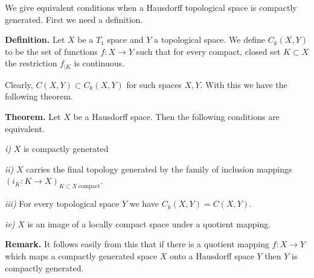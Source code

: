 \documentclass[12pt]{article}
\theoremstyle{definition}
\theoremstyle{plain}
\begin{document}
We give equivalent conditions when a Hausdorff topological space is compactly generated. First we need a definition.

\textbf{Definition.} Let $X$ be a $T_1$ space and $Y$ a topological space. We define $C_k(X, Y)$ to be the set of functions $f \colon X \to Y$ such that for every compact, closed set $K \subset X$ the restriction $f_{|K}$ is continuous. 

Clearly, $C(X, Y) \subset C_k(X, Y)$ for such spaces $X, Y$. With this we have the following theorem.

\textbf{Theorem.} Let $X$ be a Hausdorff space. Then the following conditions are equivalent.

\emph{i)} $X$ is compactly generated

\emph{ii)} $X$ carries the final topology generated by the family of inclusion mappings $(i_K \colon K \to X)_{K \subset X \ \text{compact}}$. 

\emph{iii)} For every topological space $Y$ we have $C_k(X, Y) = C(X, Y)$. 

\emph{iv)} $X$ is an image of a locally compact space under a quotient mapping.


\textbf{Remark.}
It follows easily from this that if there is a quotient mapping $f \colon X \to Y$ which maps a compactly generated space $X$ onto a Hausdorff space $Y$ then $Y$ is compactly generated.
\end{document}
